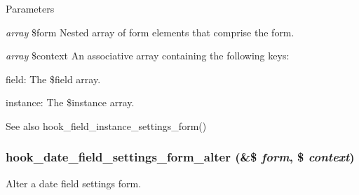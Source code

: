 \begin{DoxyParams}{Parameters}
\item[{\em array}]\$form Nested array of form elements that comprise the form. \item[{\em array}]\$context An associative array containing the following keys:
\begin{DoxyItemize}
\item field: The \$field array.
\item instance: The \$instance array.
\end{DoxyItemize}\end{DoxyParams}
\begin{DoxySeeAlso}{See also}
hook\_\-field\_\-instance\_\-settings\_\-form() 
\end{DoxySeeAlso}
\hypertarget{date_8api_8php_a109a61aa1f6183f9431a4b8e1b929e0b}{
\subsubsection[{hook\_\-date\_\-field\_\-settings\_\-form\_\-alter}]{\setlength{\rightskip}{0pt plus 5cm}hook\_\-date\_\-field\_\-settings\_\-form\_\-alter (\&\$ {\em form}, \/  \$ {\em context})}}
\label{date_8api_8php_a109a61aa1f6183f9431a4b8e1b929e0b}
Alter a date field settings form.


